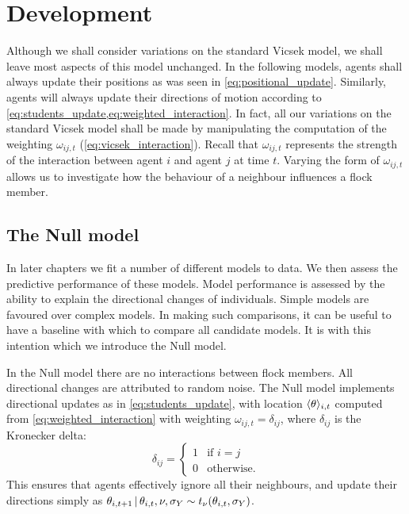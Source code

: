 \section{Development}

Although we shall consider variations on the standard Vicsek model, we shall
leave most aspects of this model unchanged. In the following models, agents
shall always update their positions as was seen in \cref{eq:positional_update}.
Similarly, agents will always update their directions of motion according to
\cref{eq:students_update,eq:weighted_interaction}. In fact, all our variations
on the standard Vicsek model shall be made by manipulating the computation of
the weighting $\omega_{ij,t}$ (\cref{eq:vicsek_interaction}). Recall that
$\omega_{ij,t}$ represents the strength of the interaction between agent $i$
and agent $j$ at time $t$. Varying the form of $\omega_{ij,t}$ allows us to
investigate how the behaviour of a neighbour influences a flock member.

\subsection{The Null model}
\label{sec:null_model}

In later chapters we fit a number of different models to data. We
then assess the predictive performance of these models. Model
performance is assessed by the ability to explain the directional changes
of individuals. Simple models are favoured over complex models. In making
such comparisons, it can be useful to have a baseline with which to compare all
candidate models. It is with this intention which we introduce the Null model.

In the Null model there are no interactions between flock members. All
directional changes are attributed to random noise. The Null model implements
directional updates as in \cref{eq:students_update}, with location
$\langle\theta\rangle_{i,t}$ computed from \cref{eq:weighted_interaction} with
weighting $\omega_{ij,t}=\delta_{ij}$, where $\delta_{ij}$ is the Kronecker
delta:
\begin{equation*}
  \delta_{ij} =
  \begin{cases}
    1 & \text{if } i=j \\
    0 & \text{otherwise.}
  \end{cases}
\end{equation*}
This ensures that agents effectively ignore all their neighbours, and update
their directions simply as $\theta_{i,t+1} \,|\, \theta_{i,t}, \nu, \sigma_Y
\sim t_\nu(\theta_{i,t}, \sigma_Y)$.

